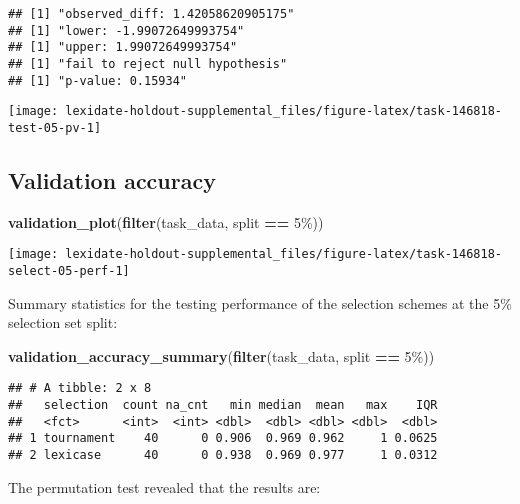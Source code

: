 \documentclass[
]{book}
\newenvironment{Shaded}{\begin{snugshade}}{\end{snugshade}}
\newcommand{\FunctionTok}[1]{\textcolor[rgb]{0.13,0.29,0.53}{\textbf{#1}}}
\newcommand{\NormalTok}[1]{#1}
\newcommand{\SpecialCharTok}[1]{\textcolor[rgb]{0.81,0.36,0.00}{\textbf{#1}}}
\newcommand{\StringTok}[1]{\textcolor[rgb]{0.31,0.60,0.02}{#1}}
\begin{document}
\begin{verbatim}
## [1] "observed_diff: 1.42058620905175"
## [1] "lower: -1.99072649993754"
## [1] "upper: 1.99072649993754"
## [1] "fail to reject null hypothesis"
## [1] "p-value: 0.15934"
\end{verbatim}

\texttt{[image: lexidate-holdout-supplemental\_files/figure-latex/task-146818-test-05-pv-1]}

\hypertarget{validation-accuracy}{%
\subsection{Validation accuracy}\label{validation-accuracy}}

\begin{Shaded}
\begin{Highlighting}[]
\FunctionTok{validation\_plot}\NormalTok{(}\FunctionTok{filter}\NormalTok{(task\_data, split }\SpecialCharTok{==} \StringTok{\textquotesingle{}5\%\textquotesingle{}}\NormalTok{))}
\end{Highlighting}
\end{Shaded}

\texttt{[image: lexidate-holdout-supplemental\_files/figure-latex/task-146818-select-05-perf-1]}

Summary statistics for the testing performance of the selection schemes at the 5\% selection set split:

\begin{Shaded}
\begin{Highlighting}[]
\FunctionTok{validation\_accuracy\_summary}\NormalTok{(}\FunctionTok{filter}\NormalTok{(task\_data, split }\SpecialCharTok{==} \StringTok{\textquotesingle{}5\%\textquotesingle{}}\NormalTok{))}
\end{Highlighting}
\end{Shaded}

\begin{verbatim}
## # A tibble: 2 x 8
##   selection  count na_cnt   min median  mean   max    IQR
##   <fct>      <int>  <int> <dbl>  <dbl> <dbl> <dbl>  <dbl>
## 1 tournament    40      0 0.906  0.969 0.962     1 0.0625
## 2 lexicase      40      0 0.938  0.969 0.977     1 0.0312
\end{verbatim}

The permutation test revealed that the results are:
\end{document}
